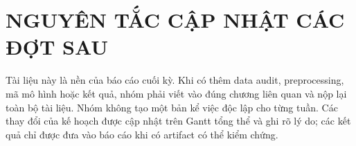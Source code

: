 \documentclass[12pt,a4paper,oneside]{report}
\begin{document}
\chapter{NGUYÊN TẮC CẬP NHẬT CÁC ĐỢT SAU}

Tài liệu này là nền của báo cáo cuối kỳ. Khi có thêm data audit, preprocessing, mã mô hình hoặc kết quả, nhóm phải viết vào đúng chương liên quan và nộp lại toàn bộ tài liệu. Nhóm không tạo một bản kể việc độc lập cho từng tuần. Các thay đổi của kế hoạch được cập nhật trên Gantt tổng thể và ghi rõ lý do; các kết quả chỉ được đưa vào báo cáo khi có artifact có thể kiểm chứng.
\end{document}
